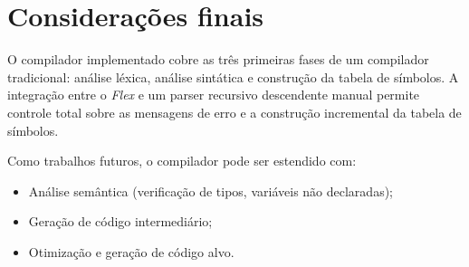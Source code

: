 \documentclass[a4paper, 12pt]{article}
\begin{document}
\section{Considera\c{c}\~oes finais}

O compilador implementado cobre as tr\^es primeiras fases de um compilador tradicional: an\'alise l\'exica, an\'alise sint\'atica e constru\c{c}\~ao da tabela de s\'imbolos. A integra\c{c}\~ao entre o \textit{Flex} e um parser recursivo descendente manual permite controle total sobre as mensagens de erro e a constru\c{c}\~ao incremental da tabela de s\'imbolos.

Como trabalhos futuros, o compilador pode ser estendido com:
\begin{itemize}
    \item An\'alise sem\^antica (verifica\c{c}\~ao de tipos, vari\'aveis n\~ao declaradas);
    \item Gera\c{c}\~ao de c\'odigo intermedi\'ario;
    \item Otimiza\c{c}\~ao e gera\c{c}\~ao de c\'odigo alvo.
\end{itemize}
\end{document}
